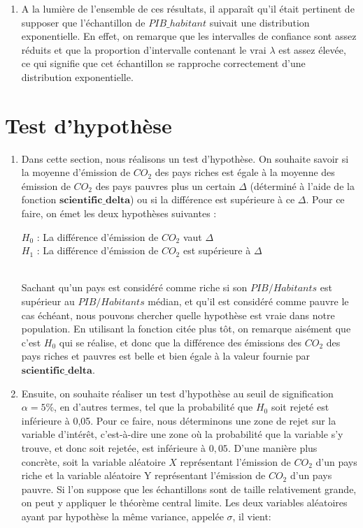 \documentclass[a4paper, 11pt]{article}
\begin{document}
\begin{enumerate}[label=(\alph*)]
 \item A la lumière de l'ensemble de ces résultats, il apparaît qu'il était pertinent de supposer que l'échantillon de $PIB\_habitant$ suivait une distribution exponentielle. En effet, on remarque que les intervalles de confiance sont assez réduits et que la proportion d'intervalle contenant  le vrai $\lambda$ est assez élevée, ce qui signifie que cet échantillon se rapproche correctement d'une distribution exponentielle.
\end{enumerate}

\section{Test d'hypothèse}
\begin{enumerate}[label=(\alph*)]
    \item Dans cette section, nous réalisons un test d'hypothèse. On souhaite savoir si la moyenne d'émission de $CO_2$ des pays riches est égale à la moyenne des émission de $CO_2$ des pays pauvres plus un certain $\Delta$ (déterminé à l'aide de la fonction $\textbf{scientific\_delta}$) ou si la différence est supérieure à ce $\Delta$. Pour ce faire, on émet les deux hypothèses suivantes :
\begin{center}
    $H_0$ : La différence d'émission de $CO_2$ vaut $\Delta$\\
    $H_1$ : La différence d'émission de $CO_2$ est supérieure à $\Delta$
\end{center}\\
Sachant qu'un pays est considéré comme riche si son $PIB/Habitants$ est supérieur au $PIB/Habitants$ médian, et qu'il est considéré comme pauvre le cas échéant, nous pouvons chercher quelle hypothèse est vraie dans notre population. En utilisant la fonction citée plus tôt, on remarque aisément que c'est $H_0$ qui se réalise, et donc que la différence des émissions des $CO_2$ des pays riches et pauvres est belle et bien égale à la valeur fournie par $\textbf{scientific\_delta}$.
\item Ensuite, on souhaite réaliser un test d'hypothèse au seuil de signification $\alpha=5\%$, en d'autres termes, tel que la probabilité que $H_0$ soit rejeté est inférieure à 0,05. Pour ce faire, nous déterminons une zone de rejet sur la variable d'intérêt, c'est-à-dire une zone où la probabilité que la variable s'y trouve, et donc soit rejetée, est inférieure à $0,05$. D'une manière plus concrète, soit la variable aléatoire $X$ représentant l'émission de $CO_2$ d'un pays riche et la variable aléatoire Y représentant l'émission de $CO_2$ d'un pays pauvre. Si l'on suppose que les échantillons sont de taille relativement grande, on peut y appliquer le théorème central limite. Les deux variables aléatoires ayant par hypothèse la même variance, appelée $\sigma$, il vient:

\end{enumerate}
\end{document}
